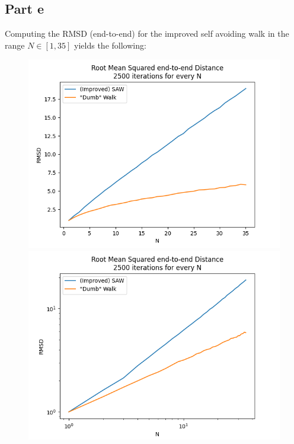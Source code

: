 \documentclass[a4paper,12pt]{article}
\begin{document}
\subsection*{Part e}

Computing the RMSD (end-to-end) for the improved self avoiding walk in the range $N \in [1, 35]$ yields the following:

\begin{figure}[!ht]
  \centering
  \begin{minipage}{0.48\textwidth}
    \includegraphics[width=\textwidth]{img/2_1e_rmsd_2500.png}
  \end{minipage}
  \begin{minipage}{0.48\textwidth}
    \includegraphics[width=\textwidth]{img/2_1e_rmsd_loglog_2500.png}
  \end{minipage}
\end{figure}
\end{document}
